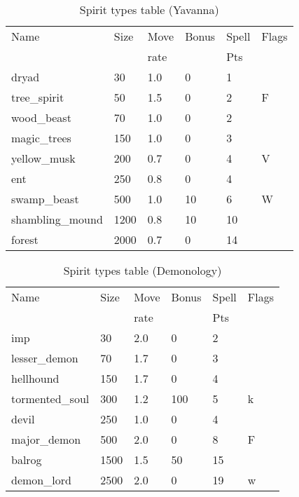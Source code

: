 \begin{same}
\begin{table}[hbpt]
\caption{Spirit types table (Yavanna)}
\begin{center}
\begin{tabular}{ || l | l | l | l | l | l || }
\hline
Name            & Size & Move & Bonus &Spell&Flags\\
                &      & rate &       &Pts  &\\
\hline
dryad           &   30 & 1.0 &   0 &  1 &\\
tree_spirit     &   50 & 1.5 &   0 &  2 &F\\
wood_beast      &   70 & 1.0 &   0 &  2 &\\
magic_trees     &  150 & 1.0 &   0 &  3 &\\
yellow_musk     &  200 & 0.7 &   0 &  4 &V\\
ent             &  250 & 0.8 &   0 &  4 &\\
swamp_beast     &  500 & 1.0 &  10 &  6 &W\\
shambling_mound & 1200 & 0.8 &  10 & 10 &\\
forest          & 2000 & 0.7 &   0 & 14 &\\
\hline
\end{tabular}
\end{center}
\end{table}
\end{same}
\begin{same}
\begin{table}[hbpt]
\caption{Spirit types table (Demonology)}
\begin{center}
\begin{tabular}{ || l | l | l | l | l | l || }
\hline
Name            & Size & Move & Bonus &Spell&Flags\\
                &      & rate &       &Pts  &\\
\hline
imp             &   30 & 2.0 &   0 &  2 &\\
lesser_demon    &   70 & 1.7 &   0 &  3 &\\
hellhound       &  150 & 1.7 &   0 &  4 &\\
tormented_soul  &  300 & 1.2 & 100 &  5 &k\\
devil           &  250 & 1.0 &   0 &  4 &\\
major_demon     &  500 & 2.0 &   0 &  8 &F\\
balrog          & 1500 & 1.5 &  50 & 15 &\\
demon_lord      & 2500 & 2.0 &   0 & 19 &w\\
\hline
\end{tabular}
\end{center}
\end{table}
\end{same}
